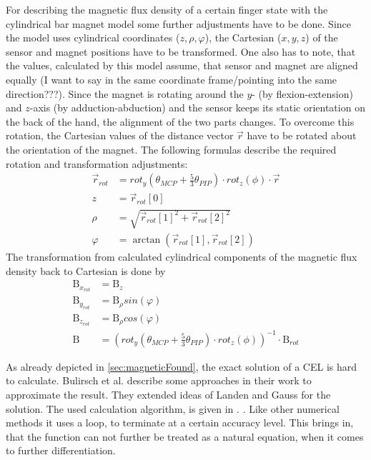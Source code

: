 For describing the magnetic flux density of a certain finger state with the cylindrical bar magnet model some further adjustments have to be done. Since the model uses cylindrical coordinates ($ z, \rho, \varphi $), the Cartesian ($ x, y, z $) of the sensor and magnet positions have to be transformed. One also has to note, that the values, calculated by this model assume, that sensor and magnet are aligned equally (I want to say in the same coordinate frame/pointing into the same direction???). Since the magnet is rotating around the $ y $- (by flexion-extension) and $ z $-axis (by adduction-abduction) and the sensor keeps its static orientation on the back of the hand, the alignment of the two parts changes. To overcome this rotation, the Cartesian values of the distance vector $ \vec{r} $ have to be rotated about the orientation of the magnet. The following formulas describe the required rotation and transformation adjustments:
\begin{equation}
\begin{aligned}
\vec{r}_{rot} &= rot_{y}(\theta_{MCP} + \frac{5}{3} \theta_{PIP}) \cdot rot_{z}(\phi) \cdot \vec{r}\\[3pt]
z &= \vec{r}_{rot}[0]\\
\rho &= \sqrt{\vec{r}_{rot}[1]^{2} + \vec{r}_{rot}[2]^2}\\
\varphi &= \arctan(\vec{r}_{rot}[1], \vec{r}_{rot}[2])
\end{aligned}
\end{equation}
The transformation from calculated cylindrical components of the magnetic flux density back to Cartesian is done by
\begin{equation}
\begin{aligned}
\mathrm{B}_{x_{rot}} &= \mathrm{B}_{z}\\
\mathrm{B}_{y_{rot}} &= \mathrm{B}_{\rho}sin(\varphi)\\
\mathrm{B}_{z_{rot}} &= \mathrm{B}_{\rho}cos(\varphi)\\[3pt]
\mathrm{B} &= (rot_{y}(\theta_{MCP} + \frac{5}{3} \theta_{PIP}) \cdot rot_{z}(\phi))^{-1} \cdot \mathrm{B}_{rot}
\end{aligned}
\end{equation}

As already depicted in \ref{sec:magneticFound}, the exact solution of a \ac{CEL} is hard to calculate. Bulirsch et al. \cite{bulirsch1965numerical} describe some approaches in their work to approximate the result. They extended ideas of Landen and Gauss for the solution. The used calculation algorithm, is given in \cite{derby2010cylindrical}. . Like other numerical methods it uses a loop, to terminate at a certain accuracy level. This brings in, that the function can not further be treated as a natural equation, when it comes to further differentiation.



